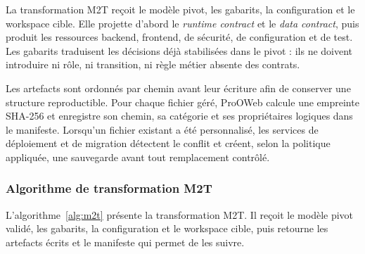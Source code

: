 La transformation M2T reçoit le modèle pivot, les gabarits, la configuration et
le workspace cible. Elle projette d'abord le \textit{runtime contract} et le \textit{data contract}, puis
produit les ressources backend, frontend, de sécurité, de configuration et de
test. Les gabarits traduisent les décisions déjà stabilisées dans le pivot :
ils ne doivent introduire ni rôle, ni transition, ni règle métier absente des
contrats.

Les artefacts sont ordonnés par chemin avant leur écriture afin de conserver
une structure reproductible. Pour chaque fichier géré, ProOWeb calcule une
empreinte SHA-256 et enregistre son chemin, sa catégorie et ses propriétaires
logiques dans le manifeste. Lorsqu'un fichier existant a été personnalisé, les
services de déploiement et de migration détectent le conflit et créent, selon
la politique appliquée, une sauvegarde avant tout remplacement contrôlé.

\subsubsection*{Algorithme de transformation M2T}
\label{sec:chap3-algorithme-m2t}

L'algorithme~\ref{alg:m2t} présente la transformation M2T. Il reçoit
le modèle pivot validé, les gabarits, la configuration et le workspace cible,
puis retourne les artefacts écrits et le manifeste qui permet de les suivre.


